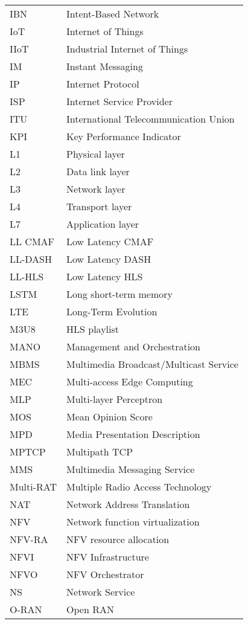 \begin{longtable}{p{}p{}}
	IBN & Intent-Based Network \\
	IoT & Internet of Things \\
	IIoT & Industrial Internet of Things \\
	IM & Instant Messaging \\
	IP & Internet Protocol \\
	ISP & Internet Service Provider \\
	ITU & International Telecommunication Union \\
	KPI & Key Performance Indicator \\
	L1 & Physical layer \\
	L2 & Data link layer \\
	L3 & Network layer \\
	L4 & Transport layer \\
	L7 & Application layer \\
	LL CMAF & Low Latency CMAF \\
	LL-DASH & Low Latency DASH \\
	LL-HLS & Low Latency HLS \\
	LSTM & Long short-term memory \\
	LTE & Long-Term Evolution \\
	M3U8 & HLS playlist \\
	MANO & Management and Orchestration \\
	MBMS & Multimedia Broadcast/Multicast Service \\
	MEC & Multi-access Edge Computing \\
	MLP & Multi-layer Perceptron \\
	MOS & Mean Opinion Score \\
	MPD & Media Presentation Description \\
	MPTCP & Multipath TCP \\
	MMS & Multimedia Messaging Service \\
	Multi-RAT & Multiple Radio Access Technology \\
	NAT & Network Address Translation \\
	NFV & Network function virtualization \\
	NFV-RA & NFV resource allocation \\
	NFVI & NFV Infrastructure \\
	NFVO & NFV Orchestrator \\
	NS & Network Service \\
	O-RAN & Open RAN \\

\end{longtable}
